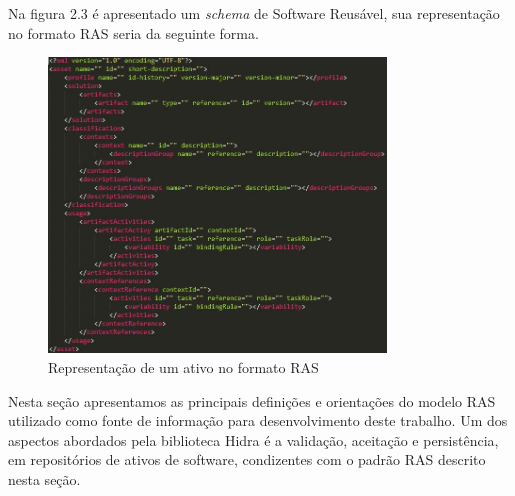     Na figura 2.3 é apresentado um \textit{schema} de Software Reusável, sua representação no formato RAS seria da seguinte forma.
    

\begin{figure}[H]
\includegraphics[width=0.8\textwidth]{images/ativoSemParametros}
\centering
\caption{ Representação de um ativo no formato RAS}
\label{Rotulo}
\end{figure}


    


    Nesta seção apresentamos as principais definições e orientações do modelo RAS utilizado como fonte de informação para desenvolvimento deste trabalho. Um dos aspectos abordados pela biblioteca Hidra é a validação, aceitação e persistência, em repositórios de ativos de software, condizentes com o padrão RAS descrito nesta seção.





